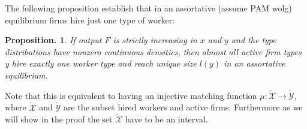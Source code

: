 \documentclass[12pt]{article}
\newtheorem{prop}{Proposition. }
\theoremstyle{definition}
\begin{document}
The following proposition establish that in an assortative (assume PAM wolg) equilibrium firms hire just one type of worker:

\begin{prop}\label{prop1}
If output $F$ is strictly increasing in $x$ and $y$ and the type distributions have nonzero continuous densities, then almost all active firm types y hire exactly one worker type and reach unique size $l(y)$ in an assortative equilibrium.
\end{prop}

Note that this is equivalent to having an injective matching function $\mu: \tilde{\mathcal{X}} \rightarrow \tilde{\mathcal{Y}}$, where $\tilde{\mathcal{X}}$ and $\tilde{\mathcal{Y}}$ are the subset hired workers and active firms. Furthermore as we will show in the proof the set $\tilde{\mathcal{X}}$ have to be an interval.
\end{document}
